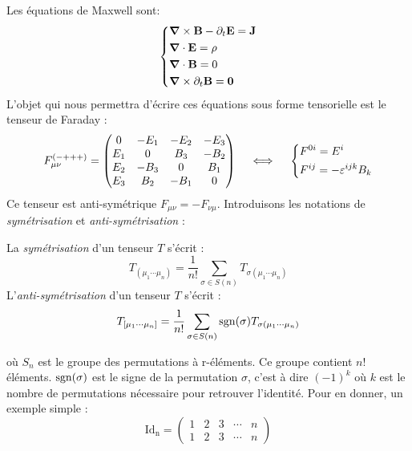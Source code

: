 Les équations de Maxwell sont:
\begin{align}
    \begin{dcases}
        \bm{\mathrm{\nabla}} \times \bm{\mathrm{B}} -\partial_{t} \bm{\mathrm{E}} = \bm{\mathrm{J}}  \\
        \bm{\mathrm{\nabla}} \cdot \bm{\mathrm{E}} = \rho\\
        \bm{\mathrm{\nabla}} \cdot \bm{\mathrm{B}} = 0\\
        \bm{\mathrm{\nabla}} \times \partial_t \bm{\mathrm{B}} = \bm{\mathrm{0}}
    \end{dcases}
\end{align}
L'objet qui nous permettra d'écrire ces équations sous forme tensorielle est le tenseur de Faraday :
\begin{align}
    \label{eq: Faraday}
    F_{\mu \nu}^{(-+++)} =  \begin{pmatrix}
    0 & -E_1 & -E_2 & -E_3\\
    E_1 & 0 & B_3 & -B_2\\
    E_2 & -B_3 & 0 & B_1\\
    E_3 & B_2 & -B_1 & 0
    \end{pmatrix} \quad \iff \quad \begin{dcases}
        F^{0i} = E^i\\
        F^{ij} = - \varepsilon^{ijk}B_k
    \end{dcases}
\end{align}
Ce tenseur est anti-symétrique $F_{\mu \nu} = - F_{\nu \mu}$. Introduisons les notations de \emph{symétrisation} et \emph{anti-symétrisation} :
\begin{theoremframe}
    \begin{defi}
        La \emph{symétrisation} d'un tenseur $T$ s'écrit :
        \begin{equation}
            T_{(\mu_{1} \cdots \mu_{n})} =\frac{1}{n!}\sum_{\sigma \in S(n)} T_{\sigma (\mu_{1} \cdots \mu_{n})}
        \end{equation}
        L'\emph{anti-symétrisation} d'un tenseur $T$ s'écrit :
        \begin{equation}
            T_{[\mu_{1} \cdots \mu_{n}]} =\frac{1}{n!}\sum_{\sigma \in S(n)} \operatorname{sgn} (\sigma) T_{\sigma (\mu_{1} \cdots \mu_{n})}
        \end{equation}
    \end{defi}
\end{theoremframe}
où $S_n$ est le groupe des permutations à r-éléments. Ce groupe contient $n!$ éléments. $\operatorname{sgn}(\sigma)$ est le signe de la permutation $\sigma$, c'est à dire $(-1)^k$ où $k$ est le nombre de permutations nécessaire pour retrouver l'identité. Pour en donner, un exemple simple :
\begin{equation*}
    \mathrm{Id_n} = 
    \begin{pmatrix}
        1 & 2 & 3 & \cdots & n \\
        1 & 2 & 3 & \cdots & n 
    \end{pmatrix}
\end{equation*}

